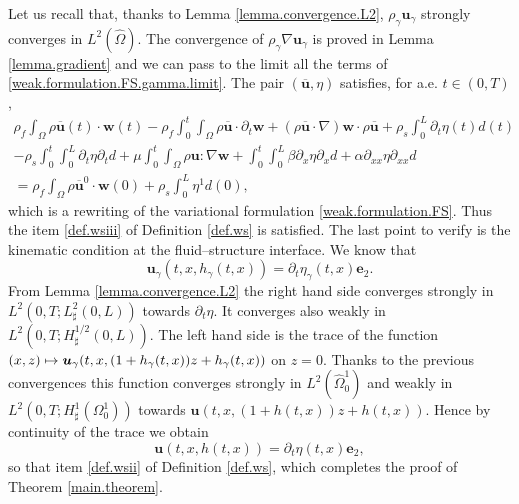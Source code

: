 \documentclass[10pt]{amsart}
\newcommand\mto{\mathchoice{\longmapsto}{\mapsto}{\mapsto}{\mapsto}}
\theoremstyle{remark}
\theoremstyle{definition}
\newcommand{\ug}{\boldsymbol{u}}
\newcommand{\wg}{\boldsymbol{w}}
\newcommand{\BS}[1]{\boldsymbol{#1}}
\let\CM\Omega
\begin{document}
Let us recall that, thanks to Lemma \ref{lemma.convergence.L2}, $\rho_\gamma \ug_{\gamma}$ strongly converges in $L^2(\hat\Omega)$. The convergence of $\rho_{\gamma} \nabla\ug_{\gamma}$ is proved in Lemma \ref{lemma.gradient} and we can pass to the limit all the terms of \eqref{weak.formulation.FS.gamma.limit}. The pair $(\overline{\ug},\eta)$ satisfies, for a.e. $t\in(0,T)$,
\begin{multline*}
\rho_{f}\int_{\CM}\rho\overline{\ug}(t)\cdot\wg(t) -\rho_{f}\int_{0}^{t}\int_{\CM}\rho\overline{\ug}\cdot\partial_{t}\wg + (\rho\overline{\ug}\cdot\nabla)\wg\cdot\rho\overline{\ug}+\rho_{s}\int_{0}^{L}\partial_{t}\eta(t)d(t)\\
-\rho_{s}\int_{0}^{t}\int_{0}^{L}\partial_{t}\eta\partial_{t}d+\mu\int_{0}^{t}\int_{\CM}\rho \ug:\nabla\wg
+\int_{0}^{t}\int_{0}^{L}\beta\partial_{x}\eta\partial_{x}d + \alpha\partial_{xx}\eta\partial_{xx}d\\
=\rho_{f}\int_{\CM}\rho\overline{\ug}^{0}\cdot\wg(0)+\rho_{s}\int_{0}^{L}\eta^{1}d(0),
\end{multline*}
which is a rewriting of the variational formulation \eqref{weak.formulation.FS}. Thus the item \eqref{def.wsiii} of Definition \ref{def.ws} is satisfied.
The last point to verify is the kinematic condition at the fluid--structure interface. We know that
\[
\ug_\gamma(t, x, h_\gamma(t, x))= \partial_t \eta_\gamma(t, x) \BS{e}_2.
\]
From Lemma \ref{lemma.convergence.L2} the right hand side converges strongly in $L^2(0, T; L_\sharp^2(0, L))$ towards $\partial_t \eta$. It converges also weakly in $L^2(0, T; H_\sharp^{1/2}(0, L))$. The left hand side is the trace of the function $(x, z) \mto \ug_\gamma(t, x, (1+h_\gamma(t, x))z + h_\gamma(t, x))$ on $z=0$. Thanks to the previous convergences this function converges strongly in $L^2(\widehat{\Omega}_0^1)$ and weakly in $L^2(0, T; H^1_\sharp(\Omega_0^1))$ towards $\ug(t, x, (1+h(t, x))z + h(t, x))$. Hence by continuity of the trace we obtain
\[
\ug(t, x, h(t, x))= \partial_t \eta(t, x) \BS{e}_2,
\]
so that item \eqref{def.wsii} of Definition \ref{def.ws}, which completes the proof of Theorem \ref{main.theorem}.
\end{document}
